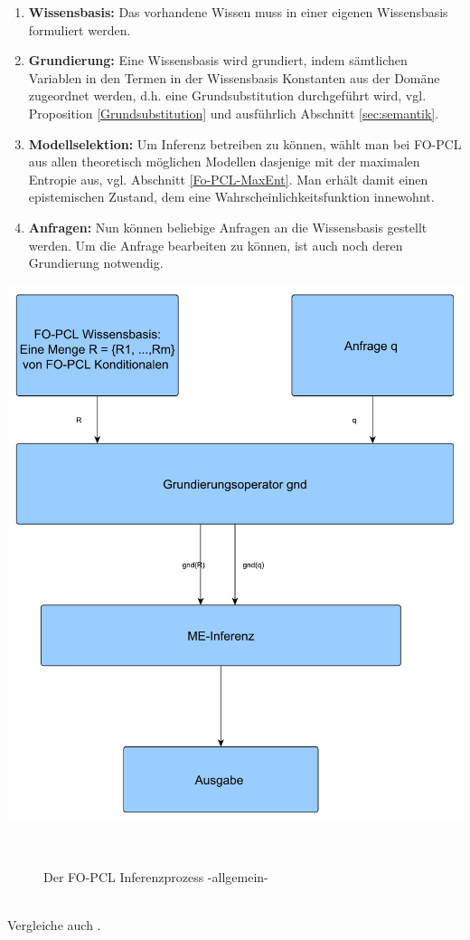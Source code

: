 \documentclass[draft]{scrreprt}
\begin{document}
\begin{enumerate}
	
\item \textbf{Wissensbasis:} 
Das vorhandene Wissen muss in einer eigenen Wissensbasis formuliert werden.
\item \textbf{Grundierung:}
Eine Wissensbasis wird grundiert, indem sämtlichen Variablen in den Termen in der Wissensbasis Konstanten aus der Domäne zugeordnet werden, d.h. eine Grundsubstitution durchgeführt wird, vgl. Proposition  \ref{Grundsubstitution} und ausführlich Abschnitt \ref{sec:semantik}.
\item \textbf{Modellselektion:}
Um Inferenz betreiben zu können, wählt man bei FO-PCL aus allen theoretisch möglichen Modellen dasjenige mit der maximalen Entropie aus, vgl. Abschnitt \ref{Fo-PCL-MaxEnt}. Man erhält damit einen epistemischen Zustand, dem eine Wahrscheinlichkeitsfunktion innewohnt.
\item \textbf{Anfragen:}
Nun können beliebige Anfragen an die Wissensbasis gestellt werden. Um die Anfrage bearbeiten zu können, ist auch noch deren Grundierung notwendig. 

\end{enumerate}
\newpage
\includegraphics[scale = 0.5]{Graphics/FO-PCL_Inferenzprozess}
\begin{figure}[h]
	\caption{Der FO-PCL Inferenzprozess -allgemein- }\
\end{figure}
\\
Vergleiche auch \cite{BHM14}.
\end{document}
